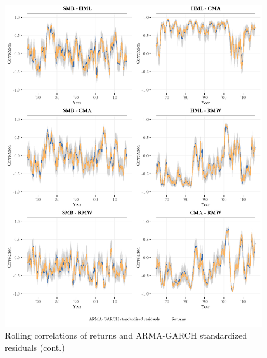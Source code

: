 \begin{figure}[H]
  \ContinuedFloat
  \centering
  \footnotesize
  \includegraphics[scale=1]{graphics/appendix_rolling2.png}

  \caption{Rolling correlations of returns and ARMA-GARCH standardized residuals (cont.)}
\end{figure}



